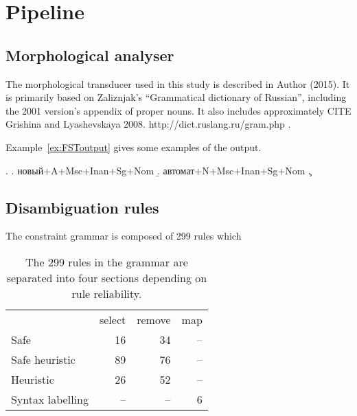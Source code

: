 \documentclass[11pt]{article}
\newcommand{\rus}[1]{\foreignlanguage{russian}{#1}}
\begin{document}



\section{Pipeline}


\subsection{Morphological analyser}

The morphological transducer used in this study is described in Author (2015). 
It is primarily based on Zaliznjak's ``Grammatical dictionary of Russian'', 
including the 2001 version's appendix of proper nouns. It also includes approximately CITE Grishina and Lyashevskaya 2008. http://dict.ruslang.ru/gram.php .

Example~\ref{ex:FSToutput} gives some examples of the output.

\ex. \label{ex:FSToutput} 
	\a. \rus{новый}+A+Msc+Inan+Sg+Nom
	\b. \rus{автомат}+N+Msc+Inan+Sg+Nom
	\c. 

\subsection{Disambiguation rules}

The constraint grammar is composed of 299 rules which 

\begin{table}
  \centering
  \begin{tabular}{lrrr}
    \hline
                     & {\sc select} & {\sc remove} & {\sc map} \\
    Safe             &   16         &   34         &  -- \\
    Safe heuristic   &   89         &   76         &  -- \\
    Heuristic        &   26         &   52         &  -- \\
    Syntax labelling & --           & --           & 6 \\ 
    \hline
  \end{tabular}
  \caption{The 299 rules in the grammar are separated into four sections depending
      on rule reliability. }
\end{table}
\end{document}
